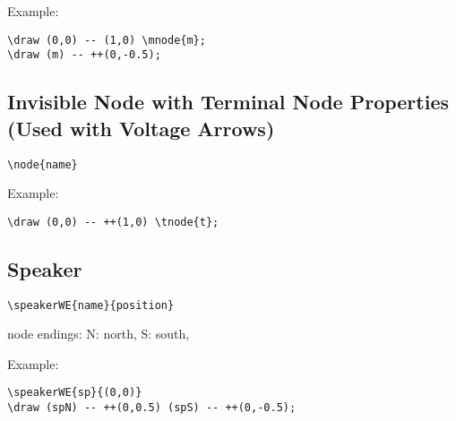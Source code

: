 \documentclass[parskip=full]{scrartcl}
\begin{document}
Example:\\
\begin{minipage}{0.8\textwidth}
\begin{verbatim}
\draw (0,0) -- (1,0) \mnode{m};
\draw (m) -- ++(0,-0.5);
\end{verbatim}
\end{minipage}
\begin{minipage}{0.19\textwidth}
\end{minipage}

\subsection{Invisible Node with Terminal Node Properties (Used with Voltage Arrows)}

\begin{verbatim}
\node{name}
\end{verbatim}

Example:\\
\begin{minipage}{0.8\textwidth}
\begin{verbatim}
\draw (0,0) -- ++(1,0) \tnode{t};
\end{verbatim}
\end{minipage}
\begin{minipage}{0.19\textwidth}
\end{minipage}

\subsection{Speaker}

\begin{verbatim}
\speakerWE{name}{position}
\end{verbatim}
node endings: N: north, S: south,

Example:\\
\begin{minipage}{0.8\textwidth}
\begin{verbatim}
\speakerWE{sp}{(0,0)}
\draw (spN) -- ++(0,0.5) (spS) -- ++(0,-0.5);
\end{verbatim}
\end{minipage}
\begin{minipage}{0.19\textwidth}
\end{minipage}
\end{document}
